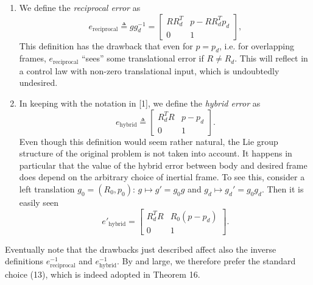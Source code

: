 \documentclass[10pt,twocolumn]{article}
\begin{document}
\begin{enumerate}[leftmargin=1.7em,itemsep=0.6em]
\item We define the \emph{reciprocal error} as
\begin{equation*}
e_{\mathrm{reciprocal}}\triangleq gg_d^{-1}
=\begin{bmatrix}
RR_d^T&p-RR_d^Tp_d\\
0&1
\end{bmatrix},
\end{equation*}
This definition has the drawback that even for $p=p_d$, i.e. for overlapping frames, $e_{\mathrm{reciprocal}}$ ``sees'' some translational error if $R\neq R_d$. This will reflect in a control law with non-zero translational input, which is undoubtedly undesired.

\item In keeping with the notation in [1], we define the \emph{hybrid error} as
\begin{equation*}
e_{\mathrm{hybrid}}\triangleq
\begin{bmatrix}
R_d^TR&p-p_d\\
0&1
\end{bmatrix}.
\end{equation*}
Even though this definition would seem rather natural, the Lie group structure of the original problem is not taken into account. It happens in particular that the value of the hybrid error between body and desired frame does depend on the arbitrary choice of inertial frame. To see this, consider a left translation $g_0=(R_0,p_0)$: $g\mapsto g'=g_0g$ and $g_d\mapsto g_d'=g_0g_d$. Then it is easily seen
\begin{equation*}
e'_{\mathrm{hybrid}}=
\begin{bmatrix}
R_d^TR&R_0(p-p_d)\\
0&1
\end{bmatrix}.
\end{equation*}
\end{enumerate}
Eventually note that the drawbacks just described affect also the inverse definitions $e_{\mathrm{reciprocal}}^{-1}$ and $e_{\mathrm{hybrid}}^{-1}$. By and large, we therefore prefer the standard choice (13), which is indeed adopted in Theorem 16.
\end{document}
